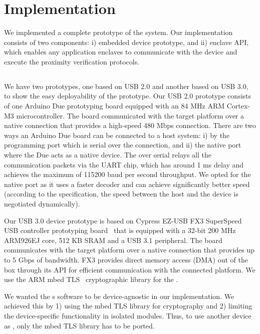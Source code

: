 \section{Implementation}
\label{sec:implementation}

We implemented a complete prototype of the \name system. Our implementation consists of two components: i) \device embedded device prototype, and ii) \name enclave API, which enables any application enclaves to communicate with the \device device and execute the proximity verification protocols.

\subsection{\device}

We have two prototypes, one based on USB 2.0 and another based on USB 3.0, to show the easy deployability of the prototype. Our USB 2.0 \device prototype consists of one Arduino Due prototyping board equipped with an 84 MHz ARM Cortex-M3 microcontroller. The board communicated with the target platform over a native  connection that provides a high-speed 480 Mbps connection. There are two ways an Arduino Due board can be connected to a host system: i) by the programming port which is serial over the \usb connection, and ii) the native \usb port where the Due acts as a native \usb device. The \usb over serial relays all the communication packets via the UART chip, which has around 1 ms delay and achieves the maximum of 115200 baud per second throughput. We opted for the native \usb port as it uses a faster  decoder and can achieve significantly better speed (according to the \usb specification, the speed between the host and the device is negotiated dynamically).


Our USB 3.0 device prototype is based on Cypress EZ-USB FX3 SuperSpeed USB controller prototyping board~\cite{fx3} that is equipped with a 32-bit 200 MHz ARM926EJ core, 512 KB SRAM and a USB 3.1 peripheral. The board communicates with the target platform over a native  connection that provides up to 5 Gbps of bandwidth. FX3 provides direct memory access (DMA) out of the box through its API for efficient communication with the connected platform. We use the ARM mbed TLS~\cite{mbed} cryptographic library for the \tls.

 We wanted the \device{}s software to be device-agnostic in our implementation. We achieved this by 1) using the mbed TLS library for cryptography and 2) limiting the device-specific functionality in isolated modules. Thus, to use another device as \device, only the mbed TLS library has to be ported.

